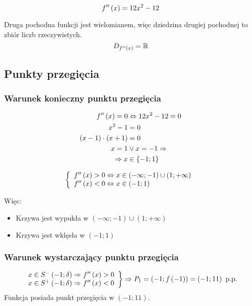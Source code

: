 \documentclass[a4paper,12pt]{article}
\newcommand{\dodx}{
		\ensuremath f'' \left( x \right)
	}
\begin{document}
\[ \dodx = 12x^2 - 12\]

Druga pochodna funkcji jest wielomianem, więc dziedzina drugiej pochodnej to zbiór liczb rzeczywistych.
\[ D_{\dodx} = \mathbb{R} \]

\subsection{Punkty przegięcia}

\subsubsection*{Warunek konieczny punktu przegięcia}

\begin{align*}
	\dodx = 0 &\Leftrightarrow 12x^2 - 12 = 0\\
	x^2 -1 &= 0 \\
	\left( x - 1 \right) \cdot \left( x + 1 \right) &= 0\\
	x = 1 &\vee x = - 1 \Rightarrow \\
	\Rightarrow x &\in \left\{ -1; 1 \right\}
\end{align*}

\[\left\{
	\begin{array}{l}
		\dodx > 0 \Leftrightarrow x \in \left( -\infty; -1 \right) \cup \left( 1; +\infty \right)\\
		\dodx < 0 \Leftrightarrow x \in \left( -1; 1 \right)
	\end{array}
\right.
\]

Więc:
\begin{itemize}
	\item Krzywa jest wypukła w $\left( -\infty; -1 \right) \cup \left( 1; +\infty \right)$
	\item Krzywa jest wklęsła w $\left( -1; 1 \right)$

\end{itemize}

\subsubsection*{Warunek wystarczający punktu przegięcia}

\[ \left.
		\begin{array}{l}
			x \in S^- \left(-1; \delta \right) \Rightarrow \dodx > 0 \\
			x \in S^+ \left(-1; \delta \right) \Rightarrow \dodx < 0
		\end{array}
	\right\} \Rightarrow P_1 = \left(-1; f \left(-1 \right) \right) = \left( -1; 11 \right) \text{ p.p.}
\]
Funkcja posiada punkt przegięcia w $\left( -1; 11 \right)$.
\end{document}
